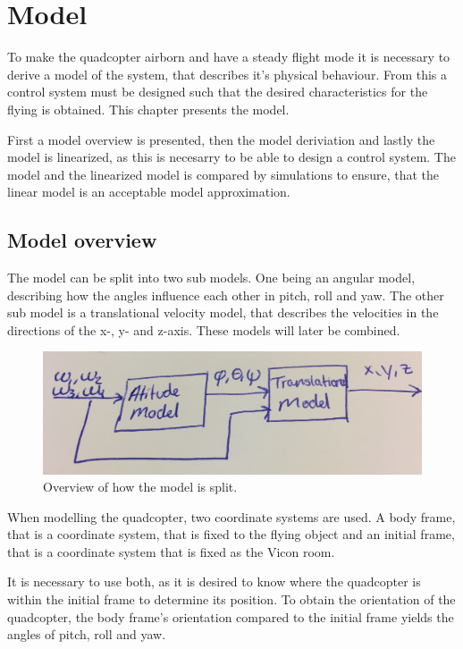 \chapter{Model}
To make the quadcopter airborn and have a steady flight mode it is necessary to derive a model of the system, that describes it's physical behaviour. From this a control system must be designed such that the desired characteristics for the flying is obtained. 
This chapter presents the model. 

First a model overview is presented, then the model deriviation and lastly the model is linearized, as this is necesarry to be able to design a control system. The model and the linearized model is compared by simulations to ensure, that the linear model is an acceptable model approximation.

\section{Model overview}
The model can be split into two sub models. One being an angular model, describing how the angles influence each other in pitch, roll and yaw. The other sub model is a translational velocity model, that describes the velocities in the directions of the x-, y- and z-axis. 
These models will later be combined. 
\begin{figure}[H]
\centering
\includegraphics[scale=0.1]{figures/modeloverview.PNG}
\caption{Overview of how the model is split.}
\label{sss}
\end{figure}
When modelling the quadcopter, two coordinate systems are used. A body frame, that is a coordinate system, that is fixed to the flying object and an initial frame, that is a coordinate system that is fixed as the Vicon room. 

It is necessary to use both, as it is desired to know where the quadcopter is within the initial frame to determine its position. To obtain the orientation of the quadcopter, the body frame's orientation compared to the initial frame yields the angles of pitch, roll and yaw. 

